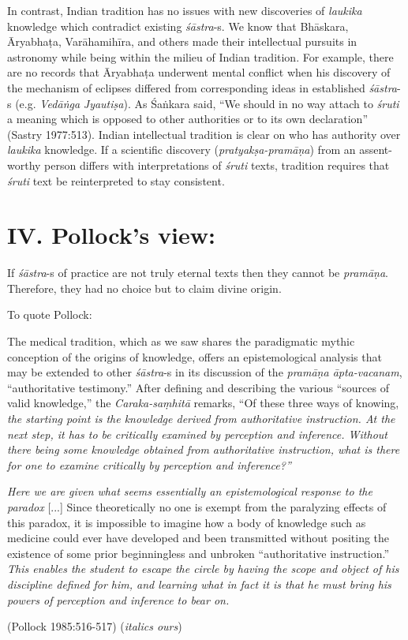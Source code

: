 In contrast, Indian tradition has no issues with new discoveries of {\sl laukika} knowledge which contradict existing {\sl śāstra}-s.  We know that Bhāskara, Āryabhaṭa, Varāhamihīra, and others made their intellectual pursuits in astronomy while being within the milieu of Indian tradition.  For example, there are no records that Āryabhaṭa underwent mental conflict when his discovery of the mechanism of eclipses differed from corresponding ideas in established \hbox{{\sl śāstra}-s} (e.g. {\sl Vedāṅga} {\sl Jyautiṣa}). As Śaṅkara said,  ``We should in no way attach to {\sl śruti} a meaning which is opposed to other authorities or to its own declaration'' (Sastry 1977:513). Indian intellectual tradition is clear on who has authority over {\sl laukika} knowledge.  If a scientific discovery ({\sl pratyakṣa-pramāṇa}) from an assent-worthy person differs with interpretations of {\sl śruti} texts, tradition requires that {\sl śruti} text be reinterpreted to stay consistent.

\section*{IV. Pollock's view:}

If {{\sl śāstra}\relax}-s of practice are not truly eternal texts then they cannot be {{\sl pramāṇa}\relax}.  Therefore, they had no choice but to claim divine origin.

To quote Pollock:
\begin{myquote}
The medical tradition, which as we saw shares the paradigmatic mythic conception of the origins of knowledge, offers an epistemological analysis that may be extended to other {\sl śāstra}-s in its discussion of the {\sl pra\-māṇa āpta-vacanam}, ``authoritative testimony.''  After defining and describing the various ``sources of valid knowledge,'' the {\sl Caraka-saṃhitā} remarks, ``Of these three ways of knowing, {\sl the starting point is the knowledge derived from authoritative instruction. At the next step, it has to be critically examined by perception and inference. Without there being some knowledge obtained from authoritative instruction, what is there for one to examine critically by perception and inference?''}

{{\sl Here we are given what seems essentially an epistemological response to the paradox}} [...] Since theoretically no one is exempt from the paralyzing effects of this paradox, it is impossible to imagine how a body of knowledge such as medicine could ever have developed and been transmitted without positing the existence of some prior beginningless and unbroken ``authoritative instruction.'' {\sl This enables the student to escape the circle by having the scope and object of his discipline defined for him, and learning what in fact it is that he must bring his powers of perception and inference to bear on.}

\hfill (Pollock 1985:516-517) ({\sl italics ours})
\end{myquote}

